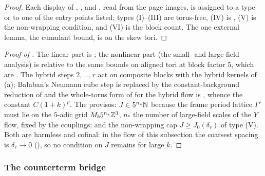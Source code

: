 \begin{proof}
Each display of \cite[Ch.~1--4]{Ba1}, \cite[pp.~556--594]{Ba2}, \cite[pp.~411--445]{Ba3} and \cite[App.]{K1}, read from the page images, is assigned to a type or to one of the entry points listed; types (I)--(III) are torus-free, (IV) is , (V) is the non-wrapping condition, and (VI) is the block count. The one external lemma, the cumulant bound, is  on the skew tori.
\end{proof}

\begin{proof}[Proof of ]
The linear part is ; the nonlinear part (the small- and large-field analysis) is  relative to the same bounds on aligned tori at block factor $5$, which are . The hybrid steps $2,\dots,r$ act on composite blocks with the hybrid kernels of (a); Ba{\l}aban's Neumann cube step is replaced by the constant-background reduction of  and the whole-torus form of \cite[Prop.~1]{Ba3} for the hybrid flow is , whence the constant $C(1+k)^p$. The provisos: $J\in5^{n_*}\mathbb N$ because the frame period lattice $\Gamma'$ must lie on the $5$-adic grid $M_b5^{n_*}\mathbb Z^3$, $n_*$ the number of large-field scales of the $Y$ flow, fixed by the couplings; and the non-wrapping cap $J\ge J_0(\delta_r)$ of type (V). Both are harmless and cofinal: in the flow of this subsection the coarsest spacing is $\delta_r\to0$ (), so no condition on $J$ remains for large $k$.
\end{proof}

\subsubsection*{The counterterm bridge}

